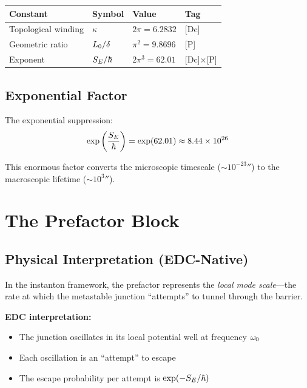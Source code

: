 \begin{center}
\begin{tabular}{llll}
\toprule
\textbf{Constant} & \textbf{Symbol} & \textbf{Value} & \textbf{Tag} \\
\midrule
Topological winding & $\kappa$ & $2\pi = 6.2832$ & [Dc] \\
Geometric ratio & $L_0/\delta$ & $\pi^2 = 9.8696$ & [P] \\
Exponent & $S_E/\hbar$ & $2\pi^3 = 62.01$ & [Dc]$\times$[P] \\
\bottomrule
\end{tabular}
\end{center}

\subsection{Exponential Factor}

The exponential suppression:
\begin{equation}
    \exp\left(\frac{S_E}{\hbar}\right) = \exp(62.01) \approx 8.44 \times 10^{26}
    \label{eq:exp_factor}
\end{equation}

This enormous factor converts the microscopic timescale ($\sim 10^{-23}\second$)
to the macroscopic lifetime ($\sim 10^{3}\second$).

\section{The Prefactor Block}
\label{sec:taun:prefactor}

\subsection{Physical Interpretation (EDC-Native)}

In the instanton framework, the prefactor represents the \emph{local mode scale}---the
rate at which the metastable junction ``attempts'' to tunnel through the barrier.

\textbf{EDC interpretation:}
\begin{itemize}
    \item The junction oscillates in its local potential well at frequency $\omega_0$
    \item Each oscillation is an ``attempt'' to escape
    \item The escape probability per attempt is $\exp(-S_E/\hbar)$
\end{itemize}

